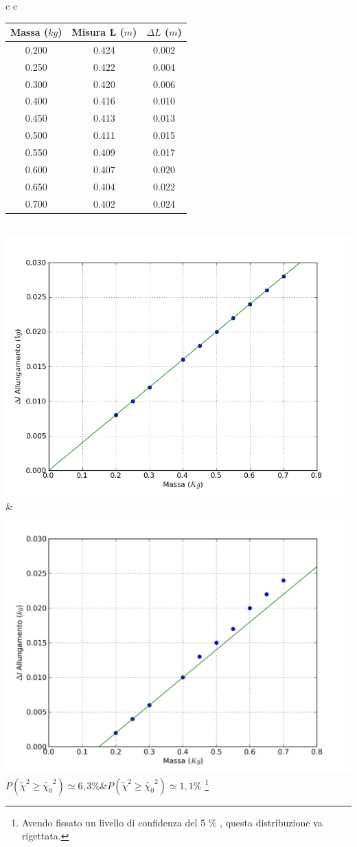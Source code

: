 \begin{center}
\begin{tabular}{c c}
\begin{tabular}{c|c|c}
Massa ($kg$) & Misura L ($m$) & $\Delta L$ ($m$)\\
\midrule
0.200 & 0.424 & 0.002\\
0.250 & 0.422 & 0.004\\
0.300 & 0.420 & 0.006\\
0.400 & 0.416 & 0.010\\
0.450 & 0.413 & 0.013\\
0.500 & 0.411 & 0.015\\
0.550 & 0.409 & 0.017\\
0.600 & 0.407 & 0.020\\
0.650 & 0.404 & 0.022\\
0.700 & 0.402 & 0.024\\
\end{tabular}
\\
\includegraphics[scale=0.4]{../grafici/molla/mollaAstatica} & \hspace{1cm}
\includegraphics[scale=0.4]{../grafici/molla/mollaBstatica}\\
$P(\tilde{\chi}^2\geq\tilde{\chi_0}^2) \simeq 6,3\%$&\hspace{1cm}$P(\tilde{\chi}^2\geq\tilde{\chi_0}^2) \simeq 1,1\%$
\footnote{Avendo fissato un livello di confidenza del 5 \% , questa distribuzione va rigettata.}\\


\end{tabular}
\end{center}
